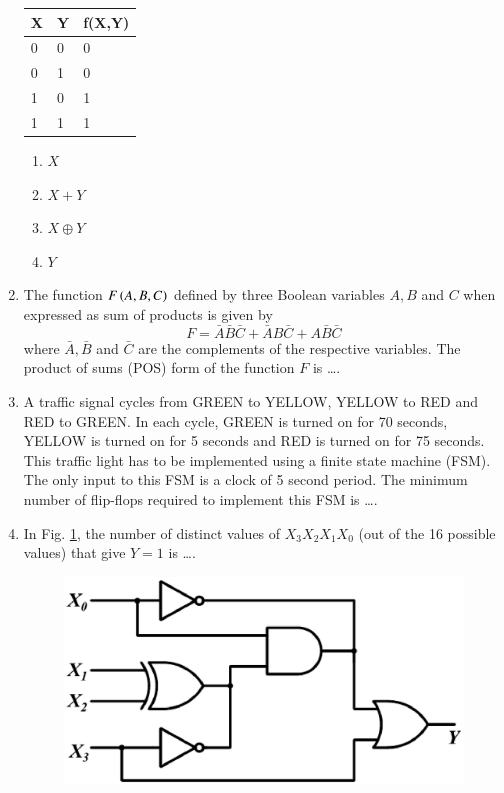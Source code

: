 \documentclass[journal,12pt,twocolumn]{IEEEtran}
\begin{document}
\begin{enumerate}
{    \centering
\begin{tabular}{ |l|l|l| }

\hline
X & Y & f(X,Y) \\ \hline
0 & 0 & 0  \\ \hline
0 & 1 & 0 \\ \hline
1 & 0 & 1  \\ \hline
1 & 1 & 1 \\ \hline
\end{tabular}
}
%
                 
         \begin{enumerate}
         \item $X$
         \item $X+Y$
         \item $X \oplus Y$
         \item $Y$
         \end{enumerate}                   
 
\item The function $F\left(A,B,C\right)$ defined by three Boolean variables $A, B$ and $C$ when expressed as sum of products is given by
\begin{equation}
F = \bar{A}\bar{B}\bar{C} + \bar{A}B\bar{C} + A\bar{B}\bar{C}
\end{equation}
where $\bar{A},\bar{B}$ and $\bar{C}$ are the complements of the respective variables.  The product of sums (POS) form of the function $F$ is \dots.
  \item A traffic signal cycles from GREEN to YELLOW, YELLOW to RED and RED to GREEN.  In each cycle, GREEN is turned on for 70 seconds, YELLOW is
  turned on  for 5 seconds and RED is turned on for 75 seconds.  This traffic light has to be implemented using a finite state machine (FSM).  
  The only input to this FSM is a clock of 5 second period.  The minimum number of flip-flops required to implement this FSM is \dots.
  \item In Fig. \ref{fig:problem53},  the number of distinct values of $X_3X_2X_1X_0$ (out of the 16 possible values) that give $Y=1$ is \dots.
  \begin{figure}[!h]
\centering
\includegraphics[width=\columnwidth]{./figs/47_gate_18.eps}
%
\caption{}
\label{fig:problem53}
\end{figure}

 \end{enumerate}
\end{document}
